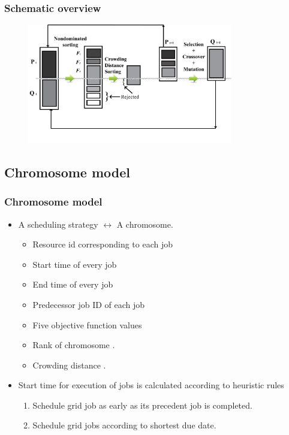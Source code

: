 \documentclass{beamer}
\begin{document}
\begin{frame}
\frametitle{Schematic overview}
\begin{figure}[t]
\centering
\includegraphics[width=0.80\textwidth]{imgs/NSGA2}
\end{figure}
\end{frame}


\subsection*{Chromosome model}
\begin{frame}[label=chromosomemod] 
\frametitle{Chromosome model}
\begin{itemize}
\item A scheduling strategy $\leftrightarrow$  A chromosome. 
\begin {itemize}
\item Resource id corresponding to each job
\item Start time of every job
\item End time of every job
\item Predecessor job ID of each job 
\item Five objective function values 
\item Rank of chromosome \hyperlink{nds1}{}.
\item Crowding distance \hyperlink{crwd}{}.
\end{itemize}
\item Start time for execution of jobs is calculated according to heuristic rules
\begin{enumerate}
 \item Schedule grid job as early as its precedent job is completed.
 \item Schedule grid jobs according to shortest due date.
\end{enumerate}
\end{itemize}
\end{frame}
\end{document}
